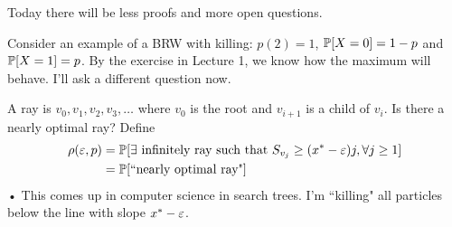 Today there will be less proofs and more open questions.

Consider an example of a BRW with killing: $p(2)=1$, $\mathbb{P}[X=0] = 1-p$ and $\mathbb{P}[X=1]=p$. 
By the exercise in Lecture 1, we know how the maximum will behave. I'll ask a different question now. 

A ray is $v_0,v_1,v_2,v_3,\ldots$ where $v_0$ is the root and $v_{i+1}$ is a child of $v_i$. Is there a nearly optimal ray? Define
\begin{align*}
\rho(\varepsilon, p) &= \mathbb{P}[\exists \text{ infinitely ray such that }S_{v_j} \ge (x^*-\varepsilon) j, \forall j\ge 1]\\
&= \mathbb{P}[\text{``nearly optimal ray"}]
\end{align*}•
This comes up in computer science in search trees. I'm ``killing" all particles below the line with slope $x^*-\varepsilon$.


